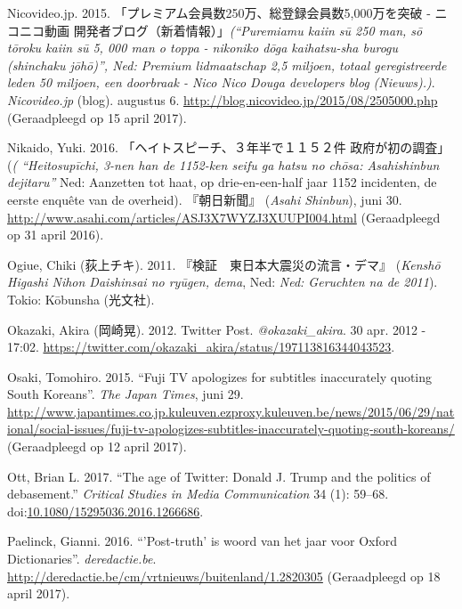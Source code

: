 \documentclass[10.5pt,dutch,]{article}
\begin{document}
\hypertarget{ref-nicovideo.jpux5fpuremiamuux5f2015}{}
Nicovideo.jp. 2015. 「プレミアム会員数250万、総登録会員数5,000万を突破 - ニコニコ動画 開発者ブログ（新着情報）」\emph{(“Puremiamu kaiin sū 250 man, sō tōroku kaiin sū 5, 000 man o toppa - nikoniko dōga kaihatsu-sha burogu (shinchaku jōhō)”, Ned: Premium lidmaatschap 2,5 miljoen, totaal geregistreerde leden 50 miljoen, een doorbraak - Nico Nico Douga developers blog (Nieuws).)}. \emph{Nicovideo.jp} (blog). augustus 6. \url{http://blog.nicovideo.jp/2015/08/2505000.php} (Geraadpleegd op 15 april 2017).

\hypertarget{ref-ux5fheitosupiichiux5f2016}{}
Nikaido, Yuki. 2016. 「ヘイトスピーチ、３年半で１１５２件 政府が初の調査」 (\emph{( “Heitosupīchi, 3-nen han de 1152-ken seifu ga hatsu no chōsa: Asahishinbun dejitaru”} Ned: Aanzetten tot haat, op drie-en-een-half jaar 1152 incidenten, de eerste enquête van de overheid). 『朝日新聞』 (\emph{Asahi Shinbun}), juni 30. \url{http://www.asahi.com/articles/ASJ3X7WYZJ3XUUPI004.html} (Geraadpleegd op 31 april 2016).

\hypertarget{ref-ogiueux5fkenshoux5f2011}{}
Ogiue, Chiki (荻上チキ). 2011. 『検証　東日本大震災の流言・デマ』 (\emph{Kenshō Higashi Nihon Daishinsai no ryūgen, dema}, Ned: \emph{Ned: Geruchten na de 2011}). Tokio: Kōbunsha (光文社).

\hypertarget{ref-okazakiux5ftwitterux5f2012}{}
Okazaki, Akira (岡崎晃). 2012. Twitter Post. \emph{@okazaki\_akira}. 30 apr. 2012 - 17:02. \url{https://twitter.com/okazaki_akira/status/197113816344043523}.

\hypertarget{ref-osakiux5ffujiux5f2015}{}
Osaki, Tomohiro. 2015. “Fuji TV apologizes for subtitles inaccurately quoting South Koreans”. \emph{The Japan Times}, juni 29. \url{http://www.japantimes.co.jp.kuleuven.ezproxy.kuleuven.be/news/2015/06/29/national/social-issues/fuji-tv-apologizes-subtitles-inaccurately-quoting-south-koreans/} (Geraadpleegd op 12 april 2017).

\hypertarget{ref-ottux5fageux5f2017}{}
Ott, Brian L. 2017. “The age of Twitter: Donald J. Trump and the politics
of debasement.” \emph{Critical Studies in Media Communication} 34 (1):
59--68.
doi:\href{https://doi.org/10.1080/15295036.2016.1266686}{10.1080/15295036.2016.1266686}.

\hypertarget{ref-paelinckux5fpost-truthux5f2016}{}
Paelinck, Gianni. 2016. “'Post-truth' is woord van het jaar voor Oxford
Dictionaries”. \emph{deredactie.be}.
\url{http://deredactie.be/cm/vrtnieuws/buitenland/1.2820305} (Geraadpleegd op 18 april 2017).
\end{document}
